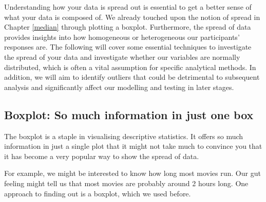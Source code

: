 \documentclass[
]{book}
\begin{document}
Understanding how your data is spread out is essential to get a better sense of what your data is composed of. We already touched upon the notion of spread in Chapter \ref{median} through plotting a boxplot. Furthermore, the spread of data provides insights into how homogeneous or heterogeneous our participants' responses are. The following will cover some essential techniques to investigate the spread of your data and investigate whether our variables are normally distributed, which is often a vital assumption for specific analytical methods. In addition, we will aim to identify outliers that could be detrimental to subsequent analysis and significantly affect our modelling and testing in later stages.

\hypertarget{boxplot-so-much-information-in-just-one-box}{%
\subsection{Boxplot: So much information in just one box}\label{boxplot-so-much-information-in-just-one-box}}

The boxplot is a staple in visualising descriptive statistics. It offers so much information in just a single plot that it might not take much to convince you that it has become a very popular way to show the spread of data.

For example, we might be interested to know how long most movies run. Our gut feeling might tell us that most movies are probably around 2 hours long. One approach to finding out is a boxplot, which we used before.
\end{document}
